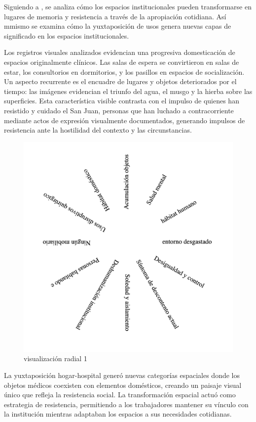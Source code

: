 \documentclass[12pt]{article}
\begin{document}
Siguiendo a \cite{DidiHuberman2011}, se analiza cómo los espacios institucionales pueden transformarse en lugares de memoria y resistencia a través de la apropiación cotidiana. Así mmismo se examina cómo la yuxtaposición de usos genera nuevas capas de significado en los espacios institucionales. 

Los registros visuales analizados evidencian una progresiva domesticación de espacios originalmente clínicos. Las salas de espera se convirtieron en salas de estar, los consultorios en dormitorios, y los pasillos en espacios de socialización. Un aspecto recurrente es el encuadre de lugares y objetos deteriorados por el tiempo: las imágenes evidencian el triunfo del agua, el musgo y la hierba sobre las superficies. Esta característica visible contrasta con el impulso de quienes han resistido y cuidado el San Juan, personas que han luchado a contracorriente mediante actos de expresión visualmente documentados, generando impulsos de resistencia ante la hostilidad del contexto y las circunstancias.

\begin{figure}[h]
    \centering
    \includegraphics[width=\textwidth]{images/category1.png}
    \caption{visualización radial 1}
    \label{fig:category1}
\end{figure}

La yuxtaposición hogar-hospital generó nuevas categorías espaciales donde los objetos médicos coexisten con elementos domésticos, creando un paisaje visual único que refleja la resistencia social. La transformación espacial actuó como estrategia de resistencia, permitiendo a los trabajadores mantener su vínculo con la institución mientras adaptaban los espacios a sus necesidades cotidianas.
\end{document}
